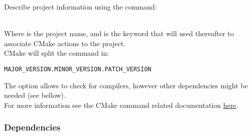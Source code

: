Describe project information using the  command:
\begin{script}
\end{script}
\\[-0.25cm]
\noindent Where  is the project name, and is the keyword that will used thereafter to associate CMake actions to the project. \\ 
CMake will split the  command in:
\begin{center}\texttt{MAJOR\_VERSION.MINOR\_VERSION.PATCH\_VERSION} \end{center}
The  option allows to check for compilers, however other dependencies might be needed (see bellow). \\[0.25cm]
For more information see the CMake  command related documentation \href{https://cmake.org/cmake/help/latest/command/project.html\#command:project}{here}.

\subsubsection*{Dependencies}
\label{cmake_deps}

